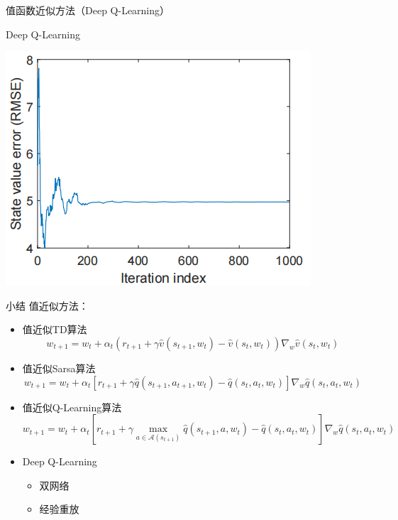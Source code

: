 \begin{section}{值函数近似方法\alert{（Deep Q-Learning）}}
\begin{frame}{Deep Q-Learning}
\begin{center}
\begin{minipage}{0.22\textwidth}
        \end{minipage}
        \hspace{1cm}
        \begin{minipage}{0.22\textwidth}
            \centering
            \includegraphics[width=\linewidth]{assets/DQN100statevalueerror.png}
        \end{minipage}
    \end{center}
\end{frame}

\begin{frame}{小结}
    值近似方法：
    \begin{itemize}
        \item 值近似TD算法
        \[
            w_{t+1}=w_t+\alpha_t(r_{t+1}+\gamma \hat{v}(s_{t+1},w_t)-\hat{v}(s_t,w_t))\nabla_w\hat{v}(s_t,w_t)
        \]
        \item 值近似Sarsa算法
        \[
            w_{t+1}=w_t+\alpha_t[r_{t+1}+\gamma \hat{q}(s_{t+1},a_{t+1},w_t)-\hat{q}(s_t,a_t,w_t)]\nabla_w\hat{q}(s_t,a_t,w_t)
        \]
        \item 值近似Q-Learning算法
        \[
            w_{t+1}=w_t+\alpha_t\left[r_{t+1}+\gamma \underset{a\in \mathcal{A}(s_{t+1})}{\max}\hat{q}(s_{t+1},a,w_t)-\hat{q}(s_t,a_t,w_t)\right]\nabla_w\hat{q}(s_t,a_t,w_t)
        \]
        \item Deep Q-Learning
        \begin{itemize}
            \item 双网络
            \item 经验重放
        \end{itemize}
    \end{itemize}
\end{frame}

\end{section}